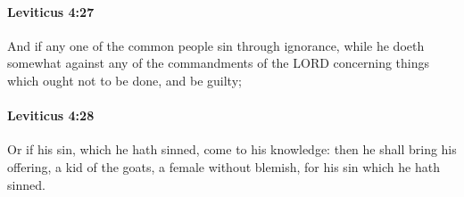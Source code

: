 		\paragraph{Leviticus 4:27} %
			\label{LEVITICUS-4-27}

			And if any one of the common people sin through ignorance, while he doeth somewhat against any of the commandments of the LORD concerning things which ought not to be done, and be guilty;


		\paragraph{Leviticus 4:28} %
			\label{LEVITICUS-4-28}

			Or if his sin, which he hath sinned, come to his knowledge: then he shall bring his offering, a kid of the goats, a female without blemish, for his sin which he hath sinned.

